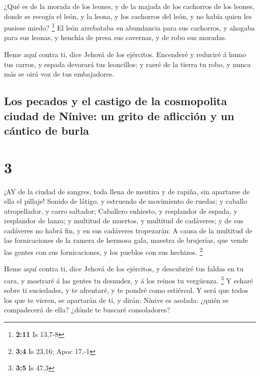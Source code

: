 ¿Qué es de la morada de los leones, y de la majada de los
cachorros de los leones, donde se recogía el león, y la leona, y los
cachorros del león, y no había quien les pusiese miedo? \footnote{\textbf{2:11}
  Is 13,7-8}  El león arrebataba en abundancia para sus
cachorros, y ahogaba para sus leonas, y henchía de presa sus cavernas, y
de robo sus moradas.

 Heme aquí contra ti, dice Jehová de los ejércitos.
Encenderé y reduciré á humo tus carros, y espada devorará tus
leoncillos; y raeré de la tierra tu robo, y nunca más se oirá voz de tus
embajadores.

\hypertarget{los-pecados-y-el-castigo-de-la-cosmopolita-ciudad-de-nuxednive-un-grito-de-aflicciuxf3n-y-un-cuxe1ntico-de-burla}{%
\subsection{Los pecados y el castigo de la cosmopolita ciudad de Nínive:
un grito de aflicción y un cántico de
burla}\label{los-pecados-y-el-castigo-de-la-cosmopolita-ciudad-de-nuxednive-un-grito-de-aflicciuxf3n-y-un-cuxe1ntico-de-burla}}

\hypertarget{section-2}{%
\section{3}\label{section-2}}

 ¡AY de la ciudad de sangres, toda llena de mentira y de
rapiña, sin apartarse de ella el pillaje!  Sonido de látigo,
y estruendo de movimiento de ruedas; y caballo atropellador, y carro
saltador;  Caballero enhiesto, y resplandor de espada, y
resplandor de lanza; y multitud de muertos, y multitud de cadáveres; y
de sus cadáveres no habrá fin, y en sus cadáveres tropezarán:
 A causa de la multitud de las fornicaciones de la ramera de
hermosa gala, maestra de brujerías, que vende las gentes con sus
fornicaciones, y los pueblos con sus hechizos. \footnote{\textbf{3:4} Is
  23,16; Apoc 17,-1}

 Heme aquí contra ti, dice Jehová de los ejércitos, y
descubriré tus faldas en tu cara, y mostraré á las gentes tu desnudez, y
á los reinos tu vergüenza. \footnote{\textbf{3:5} Is 47,3} 
Y echaré sobre ti suciedades, y te afrentaré, y te pondré como
estiércol.  Y será que todos los que te vieren, se apartarán
de ti, y dirán: Nínive es asolada: ¿quién se compadecerá de ella? ¿dónde
te buscaré consoladores?

